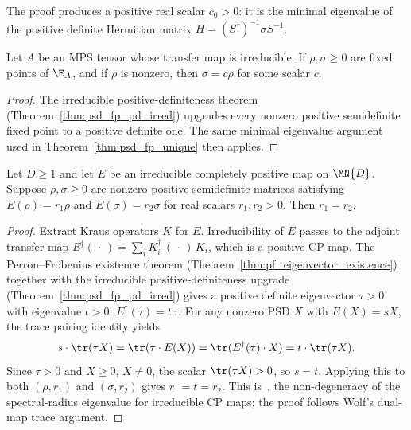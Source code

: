 \begin{remark}\leanok
    The proof produces a positive real scalar $c_0 > 0$:
    it is the minimal eigenvalue of the positive definite Hermitian
    matrix $H = (S^\dagger)^{-1} \sigma S^{-1}$.
\end{remark}

\begin{theorem}\label{thm:psd_fp_unique_irred}
    \leanok
    Let $A$ be an MPS tensor whose transfer map is irreducible.
    If $\rho,\sigma\ge 0$ are fixed points of $\E_A$, and if
    $\rho$ is nonzero, then $\sigma=c\rho$ for some scalar $c$.
\end{theorem}

\begin{proof}\leanok
    The irreducible positive-definiteness theorem
    (Theorem~\ref{thm:psd_fp_pd_irred}) upgrades every nonzero positive
    semidefinite fixed point to a positive definite one. The same minimal
    eigenvalue argument used in Theorem~\ref{thm:psd_fp_unique} then applies.
\end{proof}

\begin{theorem}%
    \label{thm:eigenvalue_unique_irred}
    \leanok
    Let $D \ge 1$ and let $E$ be an irreducible completely positive map
    on $\MN{D}$.
    Suppose $\rho, \sigma \ge 0$ are nonzero positive semidefinite matrices
    satisfying $E(\rho) = r_1 \rho$ and $E(\sigma) = r_2 \sigma$
    for real scalars $r_1, r_2 > 0$.
    Then $r_1 = r_2$.
\end{theorem}

\begin{proof}
    \leanok
    Extract Kraus operators $K$ for $E$.
    Irreducibility of $E$ passes to the adjoint transfer map
    $E^\dagger(\,\cdot\,) = \sum_i K_i^\dagger\,(\,\cdot\,)\,K_i$,
    which is a positive CP map.
    The Perron--Frobenius existence theorem
    (Theorem~\ref{thm:pf_eigenvector_existence}) together with the
    irreducible positive-definiteness upgrade
    (Theorem~\ref{thm:psd_fp_pd_irred}) gives a positive definite
    eigenvector $\tau > 0$ with eigenvalue $t > 0$:
    $E^\dagger(\tau) = t\,\tau$.
    For any nonzero PSD $X$ with $E(X) = s X$,
    the trace pairing identity yields
    \[
        s \cdot \tr(\tau X)
        = \tr(\tau \cdot E(X))
        = \tr(E^\dagger(\tau) \cdot X)
        = t \cdot \tr(\tau X).
    \]
    Since $\tau > 0$ and $X \ge 0$, $X \neq 0$,
    the scalar $\tr(\tau X) > 0$, so $s = t$.
    Applying this to both $(\rho, r_1)$ and $(\sigma, r_2)$
    gives $r_1 = t = r_2$.
    This is~\cite[Theorem~6.3, item~3]{Wolf2012Quantum}, the
    non-degeneracy of the spectral-radius eigenvalue for irreducible
    CP maps; the proof follows Wolf's dual-map trace argument.
\end{proof}


